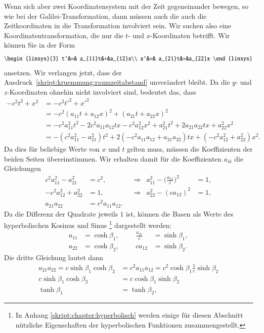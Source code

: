 Wenn sich aber zwei Koordinatensystem mit der Zeit gegeneinander bewegen,
so wie bei der Galilei-Transformation, dann müssen auch die auch
die Zeitkoordinaten in die Transformation involviert sein.
Wir suchen also eine Koordinatentransformation, die nur die
$t$- und $x$-Koordinaten betrifft.
Wir können Sie in der Form
\begin{equation}
\begin{linsys}{3}
t'&=& a_{11}t&+&a_{12}x\\
x'&=& a_{21}t&+&a_{22}x
\end{linsys}
\end{equation}
ansetzen.
Wir verlangen jetzt, dass der
Ausdruck~\eqref{skript:kruemmung:raumzeitabstand}
unverändert bleibt.
Da die $y$- und $z$-Koordinaten ohnehin nicht involviert sind, bedeutet
das, dass
\begin{align*}
-c^2t^2 + x^2
&=
-c^2t'^2 + x'^2
\\
&=
-c^2(a_{11}t+a_{12}x)^2 + (a_{21}t+a_{22}x)^2
\\
&=
-c^2a_{11}^2t^2 -2c^2a_{11}a_{12}tx -c^2a_{12}^2x^2
+a_{21}^2t^2+2a_{21}a_{22}tx+a_{22}^2x^2
\\
&=
-(c^2a_{11}^2 - a_{21}^2)t^2
+2(-c^2a_{11}a_{12}+a_{21}a_{22})tx
+(-c^2a_{12}^2 + a_{22}^2)x^2.
\end{align*}
Da dies für beliebige Werte von $x$ und $t$ gelten muss, müssen die
Koeffizienten der beiden Seiten übereinstimmen. 
Wir erhalten damit für die Koeffizienten $a_{ik}$ die Gleichungen
\[
\begin{aligned}
c^2a_{11}^2-a_{21}^2&=c^2,
&&\Rightarrow&
a_{11}^2
-
\biggl(\frac{a_{21}}{c}\biggr)^2
&=1,
\\
-c^2a_{12}^2+a_{22}^2&=1,
&&\Rightarrow
&
a_{22}^2 - (ca_{12})^2&=1,
\\
a_{21}a_{22}&=c^2a_{11}a_{12}.
\end{aligned}
\]
Da die Differenz der Quadrate jeweils $1$ ist, können die Basen
als Werte des hyperbolischen Kosinus und Sinus%
\footnote{In Anhang \ref{skript:chapter:hyperbolisch} werden einige für
diesen Abschnitt nützliche Eigenschaften der hyperbolischen Funktionen
zusammengestellt.}
dargestellt werden:
\[
\begin{aligned}
a_{11}&=\cosh\beta_1, &&&\frac{a_{21}}{c}&=\sinh\beta_1,
\\
a_{22}&=\cosh\beta_2,&&&ca_{12}&=\sinh\beta_2.
\end{aligned}
\]
Die dritte Gleichung lautet dann
\begin{align*}
a_{21}a_{22}=c\sinh\beta_1\cosh\beta_2
&=
c^2a_{11}a_{12}=c^2\cosh\beta_1\frac1c\sinh\beta_2
\\
c\sinh\beta_1\cosh\beta_2
&=
c\cosh\beta_1\sinh\beta_2
\\
\tanh\beta_1&=\tanh\beta_2,
\end{align*}
